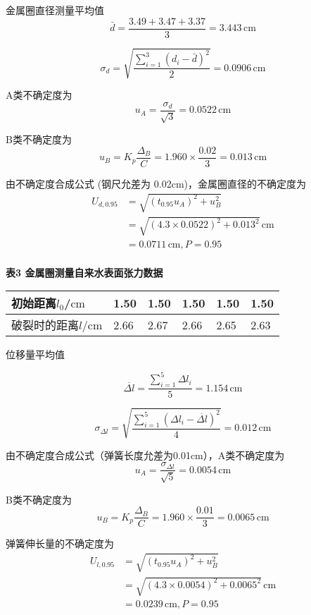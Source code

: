 \documentclass[10pt,a4paper]{article}	%
\makeatletter
\newenvironment{tablehere}
{\def\@captype{table}}
{}
\makeatother
\begin{document}
	金属圈直径测量平均值
	\[\bar{d}=\frac{3.49 + 3.47 + 3.37}{3}=3.443\,\text{cm}\]
	
	\[\sigma _d=\sqrt{\dfrac{\sum_{i=1}^{3}(d_i-\bar{d})^2}{2}}=0.0906\,\text{cm}\]
	
	A类不确定度为
	\[u_A=\dfrac{\sigma _d}{\sqrt{3}}=0.0522\,\text{cm}\]
	
	B类不确定度为
	\[u_B=K_p \dfrac{\Delta _B}{C}=1.960\times \dfrac{0.02}{3}=0.013\,\text{cm}\]
	
	由不确定度合成公式 (钢尺允差为 0.02cm)，金属圈直径的不确定度为
	\[
		\begin{aligned}
			U_{d,0.95}&=\sqrt{(t_{0.95}u_A)^2+u_B^2}\\
			&= \sqrt{(4.3 \times 0.0522)^2+0.013^2}\,\text{cm}\\
			&=0.0711\,\text{cm},P=0.95\\
		\end{aligned}
	\]


	\begin{tablehere}
		\caption*{\bf 表3 金属圈测量自来水表面张力数据}
		\noindent
		\begin{center}
			\begin{tabularx}{0.75\textwidth}{|l|Y|Y|Y|Y|Y|}
				\hline
				初始距离$l_0$/$\mathrm{cm}$ & 1.50 & 1.50 & 1.50 & 1.50 & 1.50 \\ \hline
				破裂时的距离$l$/$\mathrm{cm}$ & 2.66 & 2.67 & 2.66 & 2.65 & 2.63 \\ \hline  		
			\end{tabularx}
			\vspace*{1em}
		\end{center}
	\end{tablehere}

	位移量平均值

	\[\overline{\Delta l}=\dfrac{\sum_{i=1}^{5}\Delta l_i}{5}=1.154\,\text{cm}\]
	
	\[\sigma _{\Delta l}=\sqrt{\dfrac{\sum_{i=1}^{5}(\Delta l_i-\overline{\Delta l})^2}{4}}=0.012\,\text{cm}\]
	
	由不确定度合成公式（弹簧长度允差为0.01cm），A类不确定度为
	\[u_A=\dfrac{\sigma _{\Delta l}}{\sqrt{5}}=0.0054\,\text{cm}\]
	
	B类不确定度为
	\[u_B=K_p \dfrac{\Delta _B}{C}=1.960\times \dfrac{0.01}{3}=0.0065\,\text{cm}\]
	
	弹簧伸长量的不确定度为
	\[
		\begin{aligned}
			U_{l,0.95}&=\sqrt{(t_{0.95}u_A)^2+u_B^2}\\
			&= \sqrt{(4.3 \times 0.0054)^2+0.0065^2}\,\text{cm}\\
			&=0.0239\,\text{cm},P=0.95\\
		\end{aligned}
	\]
\end{document}
